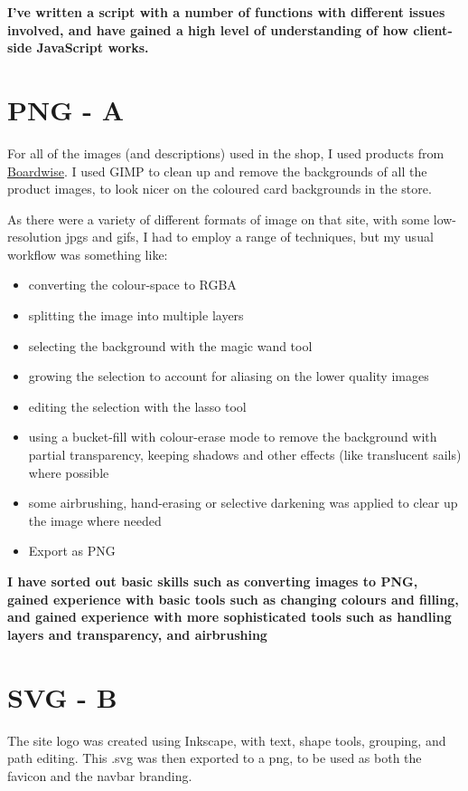 \documentclass[12pt]{article}
\begin{document}
\textbf{I've written a script with a number of functions with different issues involved, and have gained a high level of understanding of how client-side JavaScript works.}


\section*{PNG \large\normalfont - A} 
For all of the images (and descriptions) used in the shop, I used products from \underline{\href{http://www.boardwisecannock.co.uk}{Boardwise}}.
I used GIMP to clean up and remove the backgrounds of all the product images, to look nicer on the coloured card backgrounds in the store.

As there were a variety of different formats of image on that site, with some low-resolution jpgs and gifs, I had to employ a range of techniques, but my usual workflow was something like:
\vspace{-1.8em}
\begin{itemize}
\itemsep-0.5em
    \item converting the colour-space to RGBA 
    \item splitting the image into multiple layers
    \item selecting the background with the magic wand tool
    \item growing the selection to account for aliasing on the lower quality images
    \item editing the selection with the lasso tool
    \item using a bucket-fill with colour-erase mode to remove the background with partial transparency, keeping shadows and other effects (like translucent sails) where possible
    \item some airbrushing, hand-erasing or selective darkening was applied to clear up the image where needed
    \item Export as PNG
\end{itemize}

\textbf{I have sorted out basic skills such as converting images to PNG, gained experience with basic tools such as changing colours and filling, and gained experience with more sophisticated tools such as handling layers and transparency, and airbrushing}


\section*{SVG \large\normalfont - B}
The site logo was created using Inkscape, with text, shape tools, grouping, and path editing.
This .svg was then exported to a png, to be used as both the favicon and the navbar branding.
\end{document}
